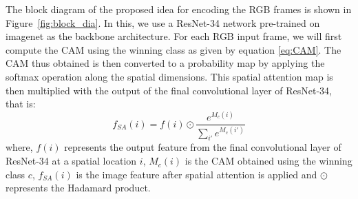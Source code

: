 \documentclass{bmvc2k}
\begin{document}
The block diagram of the proposed idea for encoding the RGB frames is shown in Figure~\ref{fig:block_dia}. In this, we use a ResNet-34 network pre-trained on imagenet as the backbone architecture. For each RGB input frame, we will first compute the CAM using the winning class as given by equation \ref{eq:CAM}. The CAM thus obtained is then converted to a probability map by applying the softmax operation along the spatial dimensions. This spatial attention map is then multiplied with the output of the final convolutional layer of ResNet-34, that is:
\begin{equation}
f_{SA}(i) = f(i) \odot \frac{e^{M_c(i)}}{\sum_{i'}e^{M_c(i')}}
\label{eq:spat_attn}
\end{equation}
where, $f(i)$ represents the output feature from the final convolutional layer of ResNet-34 at a spatial location $i$, $M_c(i)$ is the CAM obtained using the winning class $c$, $f_{SA}(i)$ is the image feature after spatial attention is applied and $\odot$ represents the Hadamard product.
\end{document}
